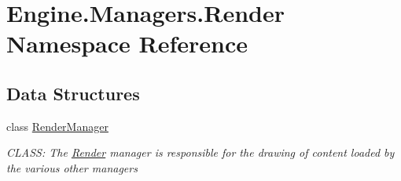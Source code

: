 \hypertarget{a00271}{}\section{Engine.\+Managers.\+Render Namespace Reference}
\label{a00271}
\subsection*{Data Structures}
\begin{DoxyCompactItemize}
\item 
class \hyperlink{a00526}{Render\+Manager}
\begin{DoxyCompactList}\small\item\em C\+L\+A\+SS\+: The \hyperlink{a00271}{Render} manager is responsible for the drawing of content loaded by the various other managers \end{DoxyCompactList}\end{DoxyCompactItemize}
